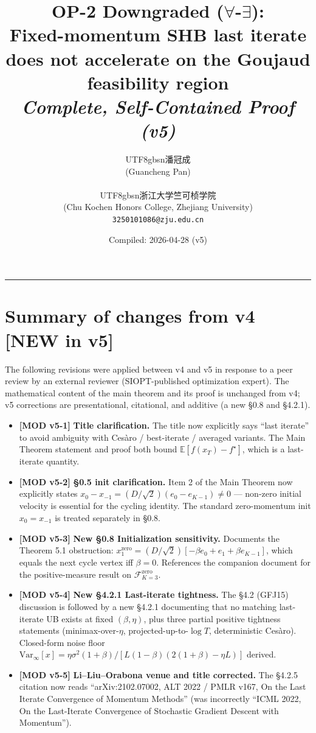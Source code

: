 \documentclass[11pt,a4paper]{article}
\title{OP-2 Downgraded ($\forall$-$\exists$):\\
Fixed-momentum SHB last iterate does not accelerate on the Goujaud feasibility region\\
\textit{Complete, Self-Contained Proof (v5)}}
\author{\begin{CJK}{UTF8}{gbsn}潘冠成\end{CJK} (Guancheng Pan)\\ \begin{CJK}{UTF8}{gbsn}浙江大学竺可桢学院\end{CJK} (Chu Kochen Honors College, Zhejiang University)\\ \texttt{3250101086@zju.edu.cn}}
\date{Compiled: 2026-04-28 (v5)}
\theoremstyle{plain}
\theoremstyle{definition}
\theoremstyle{remark}
\newcommand{\E}{\mathbb{E}}
\newcommand{\F}{\mathcal{F}}
\begin{document}
\maketitle
\tableofcontents
\bigskip
\hrule
\bigskip

\section*{Summary of changes from v4 [NEW in v5]}

The following revisions were applied between v4 and v5 in response to a peer review by an external reviewer (SIOPT-published optimization expert). The mathematical content of the main theorem and its proof is unchanged from v4; v5 corrections are presentational, citational, and additive (a new \S0.8 and \S4.2.1).

\begin{itemize}[leftmargin=*]
  \item \textbf{[MOD v5-1]} \textbf{Title clarification.} The title now explicitly says ``last iterate'' to avoid ambiguity with Ces\`aro / best-iterate / averaged variants. The Main Theorem statement and proof both bound $\E[f(x_T) - f^\star]$, which is a last-iterate quantity.
  \item \textbf{[MOD v5-2]} \textbf{\S0.5 init clarification.} Item 2 of the Main Theorem now explicitly states $x_0 - x_{-1} = (D/\sqrt 2)(e_0 - e_{K-1}) \neq 0$ --- non-zero initial velocity is essential for the cycling identity. The standard zero-momentum init $x_0 = x_{-1}$ is treated separately in \S0.8.
  \item \textbf{[MOD v5-3]} \textbf{New \S0.8 Initialization sensitivity.} Documents the Theorem 5.1 obstruction: $x_1^{\mathrm{zero}} = (D/\sqrt 2)[-\beta e_0 + e_1 + \beta e_{K-1}]$, which equals the next cycle vertex iff $\beta = 0$. References the companion document for the positive-measure result on $\F^{\mathrm{zero}}_{K=3}$.
  \item \textbf{[MOD v5-4]} \textbf{New \S4.2.1 Last-iterate tightness.} The \S4.2 (GFJ15) discussion is followed by a new \S4.2.1 documenting that no matching last-iterate UB exists at fixed $(\beta,\eta)$, plus three partial positive tightness statements (minimax-over-$\eta$, projected-up-to-$\log T$, deterministic Ces\`aro). Closed-form noise floor $\mathrm{Var}_\infty[x] = \eta\sigma^2(1+\beta) / [L(1-\beta)(2(1+\beta) - \eta L)]$ derived.
  \item \textbf{[MOD v5-5]} \textbf{Li--Liu--Orabona venue and title corrected.} The \S4.2.5 citation now reads ``arXiv:2102.07002, ALT 2022 / PMLR v167, On the Last Iterate Convergence of Momentum Methods'' (was incorrectly ``ICML 2022, On the Last-Iterate Convergence of Stochastic Gradient Descent with Momentum'').

\end{itemize}
\end{document}
